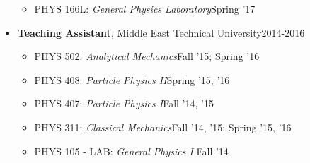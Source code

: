 \documentclass[a4paper,11pt]{article}
\begin{document}
\begin{itemize}[noitemsep,nolistsep]
\begin{itemize}
		\item[] PHYS 166L: \emph{General Physics Laboratory}\hfill Spring '17\hspace*{2.2em}\vspace*{-.3em}
	\end{itemize} 
	\item[] \textbf{Teaching Assistant}, Middle East Technical University\hfill 2014-2016
	\vspace*{-.3em}
	\begin{itemize}
	\item[] PHYS 502: \emph{Analytical Mechanics}\hfill Fall '15; Spring '16\hspace*{2.2em}\vspace*{-.3em}
	\item[] PHYS 408: \emph{Particle Physics II}\hfill Spring '15, '16\hspace*{2.2em}\vspace*{-.3em}
	\item[] PHYS 407: \emph{Particle Physics I}\hfill Fall '14, '15\hspace*{2.2em}\vspace*{-.3em}
	\item[] PHYS 311: \emph{Classical Mechanics}\hfill Fall '14, '15; Spring '15, '16\hspace*{2.2em}\vspace*{-.3em}
	\item[] PHYS 105 - LAB: \emph{General Physics I} \hfill Fall '14\hspace*{2.2em}\vspace*{-.3em}
	\end{itemize}
\end{itemize}
\end{document}
